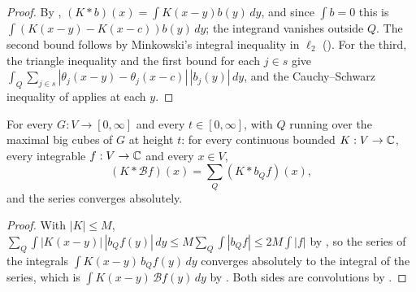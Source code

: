 \begin{proof}
\leanok
By , $(K * b)(x) = \int K(x - y) b(y) \, dy$, and since $\int b = 0$
this is $\int (K(x - y) - K(x - c)) b(y) \, dy$; the integrand vanishes outside $Q$. The second
bound follows by Minkowski's integral inequality in $\ell_2$
(). For the third, the triangle inequality and the first bound
for each $j \in s$ give
$\int_Q \sum_{j \in s} |\theta_j(x - y) - \theta_j(x - c)| \, |b_j(y)| \, dy$, and the
Cauchy--Schwarz inequality of  applies at each $y$.
\end{proof}

\begin{lemma}
\label{lem:conv-bad-part}
\leanok
{}
For every $G : V \to [0, \infty]$ and every $t \in [0, \infty]$, with $Q$ running over the
maximal big cubes of $G$ at height $t$: for every continuous bounded $K : V \to \mathbb{C}$, every
integrable $f : V \to \mathbb{C}$ and every $x \in V$,
\[
  (K * \mathcal B f)(x) = \sum_Q (K * b_Q f)(x) ,
\]
and the series converges absolutely.
\end{lemma}

\begin{proof}
\leanok
With $|K| \leq M$,
$\sum_Q \int |K(x - y)| \, |b_Q f(y)| \, dy \leq M \sum_Q \int |b_Q f| \leq 2 M \int |f|$
by , so the series of the integrals
$\int K(x - y) \, b_Q f(y) \, dy$ converges absolutely to the integral of the series, which is
$\int K(x - y) \, \mathcal B f(y) \, dy$ by . Both sides
are convolutions by .
\end{proof}

